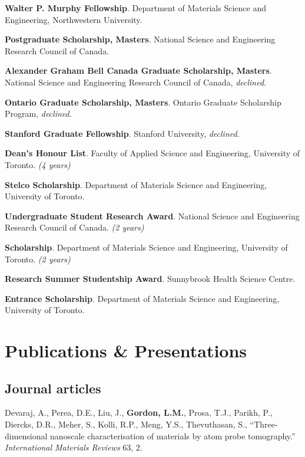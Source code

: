 \textbf{Walter P. Murphy Fellowship}. Department of Materials Science and Engineering, Northwestern University.

\textbf{Postgraduate Scholarship, Masters}. National Science and Engineering Research Council of Canada.

\textbf{Alexander Graham Bell Canada Graduate Scholarship, Masters}. National Science and Engineering Research Council of Canada, \emph{declined}.

\textbf{Ontario Graduate Scholarship, Masters}. Ontario Graduate Scholarship Program, \emph{declined}.

\textbf{Stanford Graduate Fellowship}. Stanford University, \emph{declined}.

\textbf{Dean's Honour List}. Faculty of Applied Science and Engineering, University of Toronto. \emph{(4 years)}

\textbf{Stelco Scholarship}. Department of Materials Science and Engineering, University of Toronto.

\textbf{Undergraduate Student Research Award}. National Science and Engineering Research Council of Canada. \emph{(2 years)}

\textbf{Scholarship}. Department of Materials Science and Engineering, University of Toronto. \emph{(2 years)}

\textbf{Research Summer Studentship Award}. Sunnybrook Health Science Centre.

\textbf{Entrance Scholarship}. Department of Materials Science and Engineering, University of Toronto.
\endgroup

\section*{Publications \& Presentations}

\subsection*{Journal articles}
Devaraj, A., Perea, D.E., Liu, J., \textbf{Gordon, L.M.}, Prosa, T.J., Parikh, P., Diercks, D.R., Meher, S., Kolli, R.P., Meng, Y.S., Thevuthasan, S., “Three-dimensional nanoscale characterisation of materials by atom probe tomography.” \emph{International Materials Reviews} 63, 2.
\begingroup\setlength{\parskip}{0.15cm}

